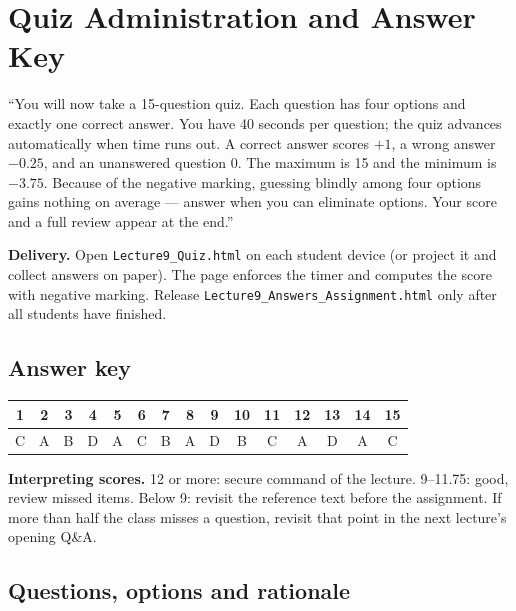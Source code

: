 \documentclass[11pt]{article}
\begin{document}
\section{Quiz Administration and Answer Key}

\begin{sayit}``You will now take a 15-question quiz. Each question has four options and exactly one correct answer. You have 40 seconds per question; the quiz advances automatically when time runs out. A correct answer scores $+1$, a wrong answer $-0.25$, and an unanswered question 0. The maximum is 15 and the minimum is $-3.75$. Because of the negative marking, guessing blindly among four options gains nothing on average --- answer when you can eliminate options. Your score and a full review appear at the end.''\end{sayit}

\textbf{Delivery.} Open \texttt{Lecture9\_Quiz.html} on each student device (or project it and collect answers on paper). The page enforces the timer and computes the score with negative marking. Release \texttt{Lecture9\_Answers\_Assignment.html} only after all students have finished.

\subsection*{Answer key}\begin{center}\small\renewcommand{\arraystretch}{1.3}\begin{tabular}{|c|c|c|c|c|c|c|c|c|c|c|c|c|c|c|}\hline \textbf{1} & \textbf{2} & \textbf{3} & \textbf{4} & \textbf{5} & \textbf{6} & \textbf{7} & \textbf{8} & \textbf{9} & \textbf{10} & \textbf{11} & \textbf{12} & \textbf{13} & \textbf{14} & \textbf{15}\\\hline C & A & B & D & A & C & B & A & D & B & C & A & D & A & C\\\hline\end{tabular}\end{center}

\textbf{Interpreting scores.} 12 or more: secure command of the lecture. 9--11.75: good, review missed items. Below 9: revisit the reference text before the assignment. If more than half the class misses a question, revisit that point in the next lecture's opening Q\&A.

\subsection*{Questions, options and rationale}
\end{document}
